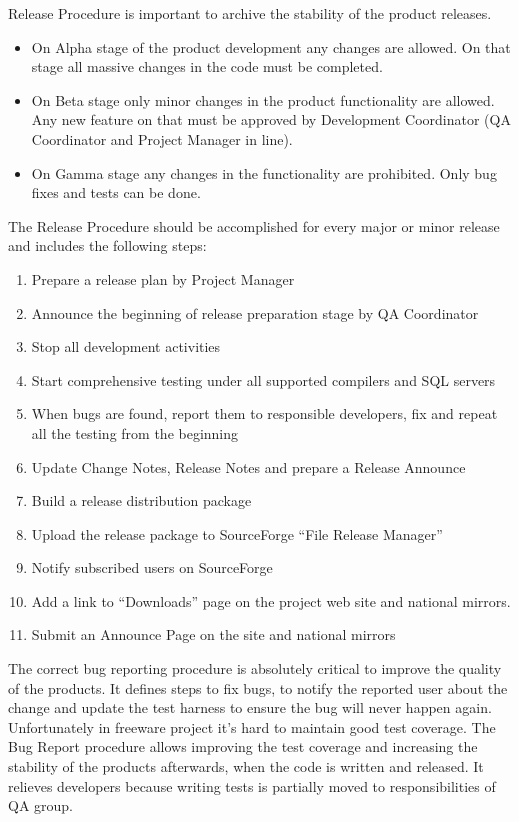\documentclass[a4paper,12pt,oneside]{book}
\begin{document}
Release Procedure is important to archive the stability of the product releases.
\begin{itemize}
  \item
	  On Alpha stage of the product development any changes are allowed.
		On that stage all massive changes in the code must be completed.
	\item
	  On Beta stage only minor changes in the product functionality are allowed.
		Any new feature on that must be approved by Development Coordinator (QA Coordinator and Project Manager in line).
	\item
	  On Gamma stage any changes in the functionality are prohibited.
		Only bug fixes and tests can be done.
\end{itemize}

The Release Procedure should be accomplished for every major or minor release and includes the following steps:
\begin{enumerate}
  \item Prepare a release plan by Project Manager
	\item Announce the beginning of release preparation stage by QA Coordinator
	\item Stop all development activities
	\item Start comprehensive testing under all supported compilers and SQL servers
	\item When bugs are found, report them to responsible developers, fix and repeat all the testing from the beginning
	\item Update Change Notes, Release Notes and prepare a Release Announce
	\item Build a release distribution package
	\item Upload the release package to SourceForge “File Release Manager”
	\item Notify subscribed users on SourceForge
	\item Add a link to “Downloads” page on the project web site and national mirrors.
	\item Submit an Announce Page on the site and national mirrors
\end{enumerate}

The correct bug reporting procedure is absolutely critical to improve the quality of the products.
It defines steps to fix bugs, to notify the reported user about the change and update the test harness to ensure the bug will never happen again.
Unfortunately in freeware project it’s hard to maintain good test coverage.
The Bug Report procedure allows improving the test coverage and increasing the stability of the products afterwards, when the code is written and released.
It relieves developers because writing tests is partially moved to responsibilities of QA group.
\end{document}
